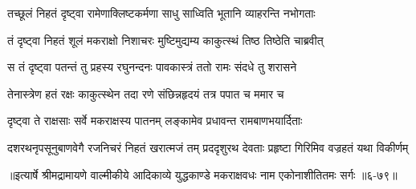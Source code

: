 \twolineshloka
{तच्छूलं निहतं दृष्ट्वा रामेणाक्लिष्टकर्मणा}
{साधु साध्विति भूतानि व्याहरन्ति नभोगताः} %

\twolineshloka
{तं दृष्ट्वा निहतं शूलं मकराक्षो निशाचरः}
{मुष्टिमुद्यम्य काकुत्स्थं तिष्ठ तिष्ठेति चाब्रवीत्} %

\twolineshloka
{स तं दृष्ट्वा पतन्तं तु प्रहस्य रघुनन्दनः}
{पावकास्त्रं ततो रामः संदधे तु शरासने} %

\twolineshloka
{तेनास्त्रेण हतं रक्षः काकुत्स्थेन तदा रणे}
{संछिन्नहृदयं तत्र पपात च ममार च} %

\twolineshloka
{दृष्ट्वा ते राक्षसाः सर्वे मकराक्षस्य पातनम्}
{लङ्कामेव प्रधावन्त रामबाणभयार्दिताः} %

\twolineshloka
{दशरथनृपसूनुबाणवेगै रजनिचरं निहतं खरात्मजं तम्}
{प्रददृशुरथ देवताः प्रहृष्टा गिरिमिव वज्रहतं यथा विकीर्णम्} %


॥इत्यार्षे श्रीमद्रामायणे वाल्मीकीये आदिकाव्ये युद्धकाण्डे मकराक्षवधः नाम एकोनाशीतितमः सर्गः ॥६-७९॥
